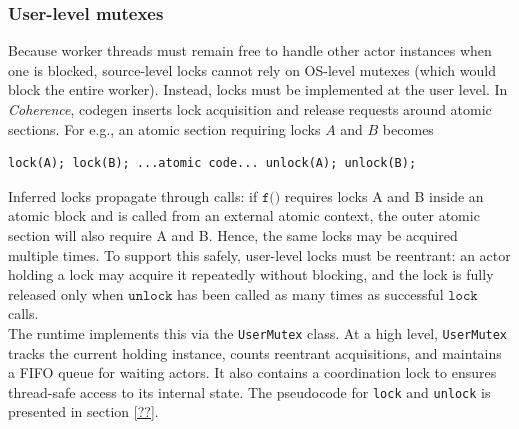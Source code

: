 \documentclass[a4paper,12pt,fleqn]{article}
\begin{document}
\subsubsection{User-level mutexes}
Because worker threads must remain free to handle other actor instances when one is blocked, source-level locks cannot rely on OS-level mutexes (which would block the entire worker). Instead, locks must be implemented at the user level. In \textit{Coherence}, codegen inserts lock acquisition and release requests around atomic sections. For e.g., an atomic section requiring locks $A$ and $B$ becomes
\begin{lstlisting}
lock(A); lock(B); ...atomic code... unlock(A); unlock(B);  
\end{lstlisting} 
Inferred locks propagate through calls: if \(\texttt{f()}\) requires locks A and B inside an atomic block and is called from an external atomic context, the outer atomic section will also require A and B. Hence, the same locks may be acquired multiple times. To support this safely, user-level locks must be reentrant: an actor holding a lock may acquire it repeatedly without blocking, and the lock is fully released only when \(\texttt{unlock}\) has been called as many times as successful \(\texttt{lock}\) calls.\\
The runtime implements this via the \texttt{UserMutex} class. At a high level, \texttt{UserMutex} tracks the current holding instance, counts reentrant acquisitions, and maintains a FIFO queue for waiting actors. It also contains a coordination lock to ensures thread-safe access to its internal state. The pseudocode for \texttt{lock} and \texttt{unlock} is presented in section \ref{??}.
\end{document}

